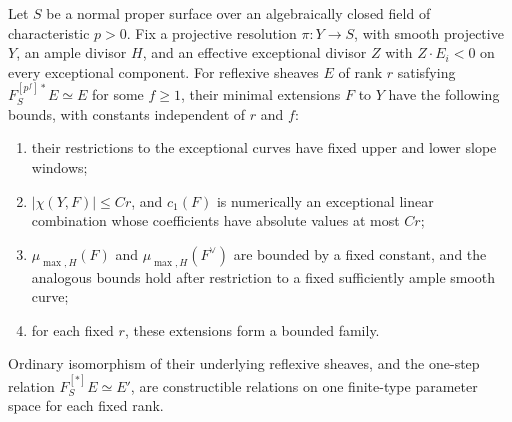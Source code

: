 \begin{proposition}
\label{D:global-periodic-reflexive-boundedness}
Let $S$ be a normal proper surface over an algebraically closed field
of characteristic $p>0$. Fix a projective resolution $\pi:Y\to S$,
with smooth projective $Y$, an ample divisor $H$, and an effective
exceptional divisor $Z$ with $Z\cdot E_i<0$ on every exceptional
component. For reflexive sheaves $E$ of rank $r$ satisfying
$F_S^{[p^f]*}E\simeq E$ for some $f\ge1$, their minimal extensions
$F$ to $Y$ have the following bounds, with constants independent of
$r$ and $f$:
\begin{enumerate}
\item their restrictions to the exceptional curves have fixed upper
and lower slope windows;
\item $|\chi(Y,F)|\le Cr$, and $c_1(F)$ is numerically an exceptional
linear combination whose coefficients have absolute values at most $Cr$;
\item $\mu_{\max,H}(F)$ and $\mu_{\max,H}(F^\vee)$ are bounded by a
fixed constant, and the analogous bounds hold after restriction to a
fixed sufficiently ample smooth curve;
\item for each fixed $r$, these extensions form a bounded family.
\end{enumerate}
Ordinary isomorphism of their underlying reflexive sheaves, and the
one-step relation $F_S^{[*]}E\simeq E'$, are constructible relations on
one finite-type parameter space for each fixed rank.
\end{proposition}

